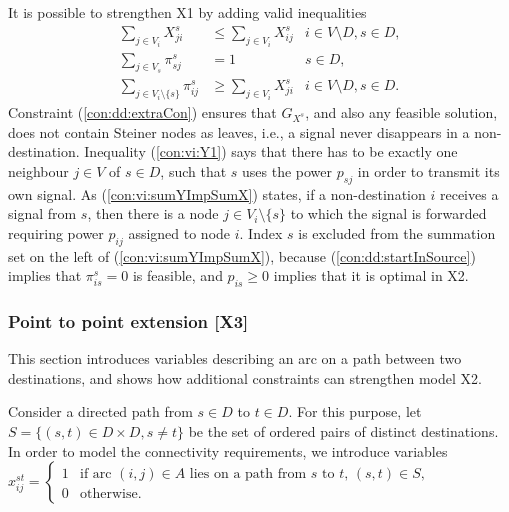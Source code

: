It is possible to strengthen X1 by adding valid inequalities
\begin{subequations}[resume]
\begin{align}
\label{con:dd:extraCon} \sum\limits_{j\in V_{i}}X^s_{ji} & \leq \sum\limits_{j\in V_{i}}X^s_{ij}  & 	i\in V\setminus D, s\in D,\\
\label{con:vi:Y1} \sum\limits_{j\in V_s}  \pi^{s}_{sj} & =1 & s\in D,\\
\label{con:vi:sumYImpSumX} \sum\limits_{j\in V_i\setminus\{s\} }\pi^{s}_{ij} & \geq \sum\limits_{j\in V_i}  X^{s}_{ji} & i\in V\setminus D, s\in D.
\end{align}
\end{subequations}
Constraint (\ref{con:dd:extraCon}) ensures that $G_{X^s}$, and also any feasible solution, does not contain Steiner nodes as leaves, i.e., a signal never disappears in a non-destination.
Inequality (\ref{con:vi:Y1}) says that there has to be exactly one neighbour $j\in V$ of $s\in D$, such that $s$ uses the power $p_{sj}$ in order to transmit its own signal.
As (\ref{con:vi:sumYImpSumX}) states, if a non-destination $i$ receives a signal from $s$, then there is a node $j\in V_i\setminus\{s\}$ to which the signal is forwarded requiring power $p_{ij}$ assigned to node $i$.
Index $s$ is excluded from the summation set on the left of (\ref{con:vi:sumYImpSumX}), because (\ref{con:dd:startInSource}) implies that $\pi_{is}^s=0$ is feasible, and $p_{is}\geq 0$ implies that it is optimal in X2. 

\subsubsection{Point to point extension [X3]}
\label{sec:smtx2}

This section introduces variables describing an arc on a path between two destinations, and shows how additional constraints can strengthen model X2.

Consider a directed path from $s\in D$ to $t\in D$.
For this purpose, let $S=\{(s,t)\in D\times D, s\neq t\}$ be the set of ordered pairs of distinct destinations.
In order to model the connectivity requirements, we introduce variables
\newline\newline
$x_{ij}^{st}=
\begin{cases}
    1 & \text{if arc $(i,j) \in A$ lies on a path from $s$ to $t$, $(s,t)\in S$},\\
    0 & \text{otherwise}.
\end{cases}$
\newline\newline

